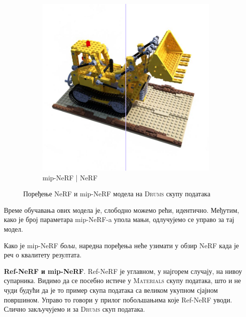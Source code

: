 \documentclass[12pt, a4paper, twoside]{book}
\numberwithin{equation}{chapter}
\numberwithin{theorem}{section}
\numberwithin{definition}{section}
\numberwithin{definitionChapter}{chapter}
\begin{document}
\begin{figure}[H]
\begin{subfigure}{0.475\textwidth}
			\includegraphics[scale=0.25]{img/comparison/mipnerf_vs_nerf_lego_31.png}
			\caption{mip-NeRF | NeRF}
		\end{subfigure}
		\caption{Поређење NeRF и mip-NeRF модела на \textsc{Drums} скупу података}
		\label{fig-lego-comparison}
	\end{figure}

Време обучавања ових модела је, слободно можемо рећи, идентично. Међутим, како је број параметара mip-NeRF-a упола мањи,
одлучујемо се управо за тај модел.

Како је mip-NeRF \textit{бољи}, наредна поређења неће узимати у обзир NeRF када је реч о квалитету резултата.

\textbf{Ref-NeRF и mip-NeRF}. Ref-NeRF је углавном, у најгорем случају, на нивоу супарника. Видимо да се посебно истиче у
\textsc{Materials} скупу података, што и не чуди будући да је то пример скупа података са великом укупном сјајном површином.
Управо то говори у прилог побољшањима које Ref-NeRF уводи. Слично закључујемо и за \textsc{Drums} скуп података.
\end{document}

